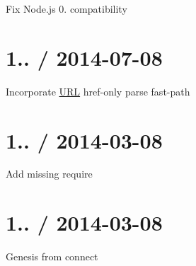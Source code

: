 \begin{DoxyItemize}
\item Fix Node.\+js 0. compatibility
\end{DoxyItemize}

\section*{1.. / 2014-\/07-\/08 }


\begin{DoxyItemize}
\item Incorporate \mbox{\hyperlink{namespace_u_r_l}{U\+RL}} href-\/only parse fast-\/path
\end{DoxyItemize}

\section*{1.. / 2014-\/03-\/08 }


\begin{DoxyItemize}
\item Add missing {\ttfamily require}
\end{DoxyItemize}

\section*{1.. / 2014-\/03-\/08 }


\begin{DoxyItemize}
\item Genesis from {\ttfamily connect} 
\end{DoxyItemize}